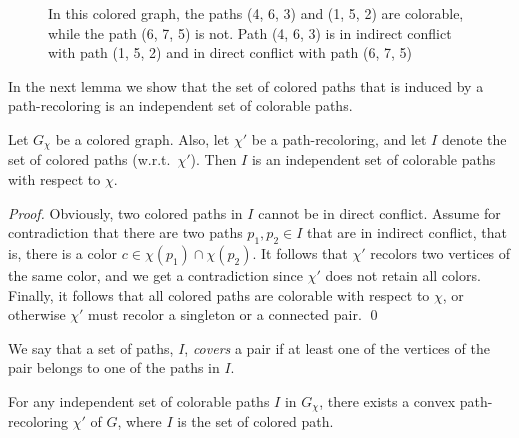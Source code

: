\begin{figure}[t]
\centering


\caption{
\label{fig:paths}
In this colored graph, the paths (4, 6, 3) and (1, 5, 2) are colorable, while
the path (6, 7, 5) is not.
Path (4, 6, 3) is in indirect conflict with path (1, 5, 2) and in direct
conflict with path (6, 7, 5)
}
\end{figure}

In the next lemma we show that the set of colored paths that is
induced by a path-recoloring is an independent set of colorable paths.

\begin{lemma}
\label{lm:independent}
Let $G_\chi$ be a colored graph.
%
Also, 
let $\chi'$ be a path-recoloring,
and let $I$ denote the set of colored paths (w.r.t.\ $\chi'$).  
%
Then $I$ is an independent set of colorable paths with respect to $\chi$.
\end{lemma}

\begin{proof}
Obviously, 
two colored paths in $I$ cannot be in direct conflict.
%
Assume for contradiction that there are two paths $p_1, p_2 \in I$
that are in indirect conflict, 
that is, 
there is a color $c \in \chi(p_1) \cap \chi(p_2)$.
%
It follows that $\chi'$ recolors two vertices of the same color, 
and we get a contradiction since $\chi'$ does not retain all colors.
%
Finally, 
it follows that all colored paths are colorable with respect to $\chi$, 
or otherwise $\chi'$ must recolor a singleton or a connected pair.
\qed{}\end{proof}

We say that a set of paths, $I$, \emph{covers} a pair if at least one of the
vertices of the pair belongs to one of the paths in $I$.

\begin{lemma}
\label{lm:independent_set_is_recoloring}
For any independent set of colorable paths $I$ in $G_{\chi}$, 
there exists a convex path-recoloring $\chi'$ of $G$, 
where $I$ is the set of colored path.
\end{lemma}

